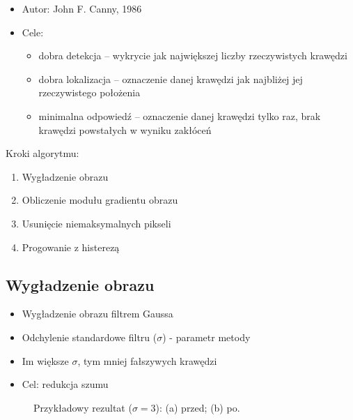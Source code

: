 \documentclass[a4paper,twocolumn,12pt]{article}
\begin{document}
\begin{itemize}
 \item Autor: John F. Canny, 1986
 \item Cele:
  \begin{itemize}
   \item dobra detekcja – wykrycie jak największej liczby rzeczywistych krawędzi
   \item dobra lokalizacja – oznaczenie danej krawędzi jak najbliżej jej rzeczywistego położenia
   \item minimalna odpowiedź – oznaczenie danej krawędzi tylko raz, brak krawędzi powstałych w wyniku zakłóceń
  \end{itemize}
\end{itemize}

Kroki algorytmu:
\begin{enumerate}
 \item Wygładzenie obrazu
 \item Obliczenie modułu gradientu obrazu
 \item Usunięcie niemaksymalnych pikseli
 \item Progowanie z histerezą
\end{enumerate}


\subsection{Wygładzenie obrazu}

\begin{itemize}
 \item Wygładzenie obrazu filtrem Gaussa
 \item Odchylenie standardowe filtru ($\sigma$) - parametr metody
 \item Im większe $\sigma$, tym mniej fałszywych krawędzi
 \item Cel: redukcja szumu
\end{itemize}

\begin{figure}[!ht]
 \begin{center}
 \end{center}
 \caption{
  Przykładowy rezultat ($\sigma = 3$):
  (a) przed;
  (b) po.
 }
 \label{fig:canny_smoothing}
\end{figure}
\end{document}
